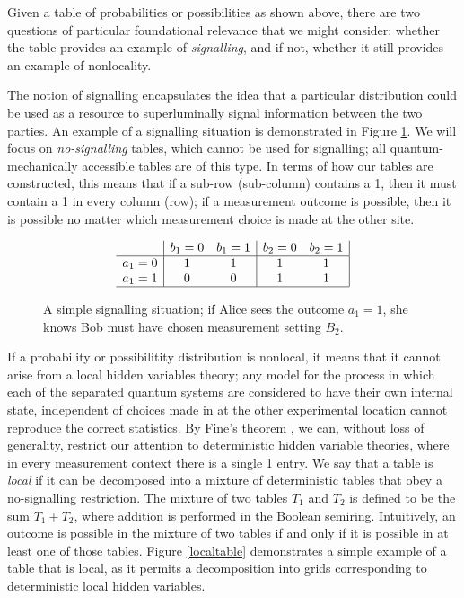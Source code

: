 \documentclass[reprint]{revtex4-1}
\theoremstyle{definition}
\begin{document}
Given a table of probabilities or possibilities as shown above, there are two questions of particular foundational relevance that we might consider: whether the table provides an example of \emph{signalling}, and if not, whether it still provides an example of nonlocality.

The notion of signalling encapsulates the idea that a particular distribution could be used as a resource to superluminally signal information between the two parties. An example of a signalling situation is demonstrated in Figure \ref{sig}. We will focus on \emph{no-signalling} tables, which cannot be used for signalling; all quantum-mechanically accessible tables are of this type. In terms of how our tables are constructed, this means that if a sub-row (sub-column) contains a 1, then it must contain a 1 in every column (row); if a measurement outcome is possible, then it is possible no matter which measurement choice is made at the other site.
\begin{figure}
\begin{equation*}
\begin{array}{c| c c | c c |}
&b_1=0&b_1=1&b_2=0&b_2=1\\ \hline
a_1=0&1 &1  &1 & 1\\
a_1=1&0&0 &1 &1\\ \hline
\end{array} 
\end{equation*}
\caption{A simple signalling situation; if Alice sees the outcome $a_1=1$, she knows Bob must have chosen measurement setting $B_2$.}
\label{sig}
\end{figure}

If a probability or possibilitity distribution is nonlocal, it means that it cannot arise from a local hidden variables theory; any model for the process in which each of the separated quantum systems are considered to have their own internal state, independent of choices made in at the other experimental location cannot reproduce the correct statistics. By Fine's theorem \cite{Fine1982}, we can, without loss of generality, restrict our attention to deterministic hidden variable theories, where in every measurement context there is a single 1 entry. We say that a table is \emph{local} if it can be decomposed into a mixture of deterministic tables that obey a no-signalling restriction. The mixture of two tables $T_1$ and $T_2$ is defined to be the sum $T_1+T_2$, where addition is performed in the Boolean semiring. Intuitively, an outcome is possible in the mixture of two tables if and only if it is possible in at least one of those tables. Figure \ref{localtable} demonstrates a simple example of a table that is local, as it permits a decomposition into grids corresponding to deterministic local hidden variables.
\end{document}
